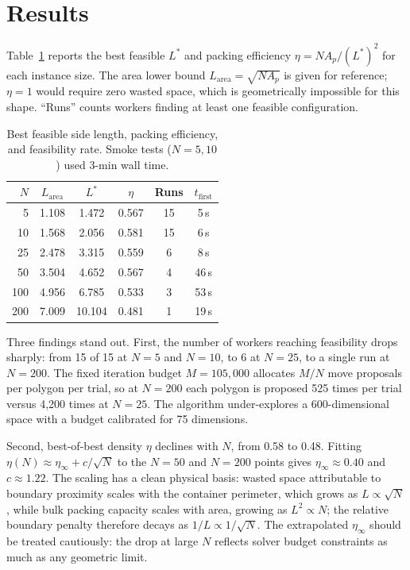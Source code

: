 \documentclass[10pt,twocolumn]{article}
\begin{document}
\section{Results}
\label{sec:results}

Table~\ref{tab:results} reports the best feasible $L^*$ and packing
efficiency $\eta = NA_p/(L^*)^2$ for each instance size. The area
lower bound $L_{\mathrm{area}} = \sqrt{NA_p}$ is given for reference;
$\eta = 1$ would require zero wasted space, which is geometrically
impossible for this shape. ``Runs'' counts workers finding at least
one feasible configuration.

\begin{table}[h]
\centering\small
\setlength{\tabcolsep}{3.5pt}
\caption{Best feasible side length, packing efficiency, and feasibility
rate. Smoke tests ($N = 5, 10$) used 3-min wall time.}
\label{tab:results}
\begin{tabular}{r@{\hskip6pt}ccccc}
\toprule
$N$ & $L_{\mathrm{area}}$ & $L^*$ & $\eta$ & Runs &
$t_{\mathrm{first}}$ \\
\midrule
  5 & 1.108 & 1.472 & 0.567 & 15 &  5\,s \\
 10 & 1.568 & 2.056 & 0.581 & 15 &  6\,s \\
 25 & 2.478 & 3.315 & 0.559 &  6 &  8\,s \\
 50 & 3.504 & 4.652 & 0.567 &  4 & 46\,s \\
100 & 4.956 & 6.785 & 0.533 &  3 & 53\,s \\
200 & 7.009 & 10.104& 0.481 &  1 & 19\,s \\
\bottomrule
\end{tabular}
\end{table}

Three findings stand out. First, the number of workers reaching
feasibility drops sharply: from 15 of 15 at $N = 5$ and $N = 10$,
to 6 at $N = 25$, to a single run at $N = 200$. The fixed iteration
budget $M = 105{,}000$ allocates $M/N$ move proposals per polygon per
trial, so at $N = 200$ each polygon is proposed 525 times per trial
versus 4{,}200 times at $N = 25$. The algorithm under-explores a
600-dimensional space with a budget calibrated for 75 dimensions.

Second, best-of-best density $\eta$ declines with $N$, from 0.58 to
0.48. Fitting $\eta(N) \approx \eta_\infty + c/\sqrt{N}$ to the $N =
50$ and $N = 200$ points gives $\eta_\infty \approx 0.40$ and
$c \approx 1.22$. The scaling has a clean physical basis: wasted space
attributable to boundary proximity scales with the container perimeter,
which grows as $L \propto \sqrt{N}$, while bulk packing capacity scales
with area, growing as $L^2 \propto N$; the relative boundary penalty
therefore decays as $1/L \propto 1/\sqrt{N}$. The extrapolated
$\eta_\infty$ should be treated cautiously: the drop at large $N$
reflects solver budget constraints as much as any geometric limit.
\end{document}
